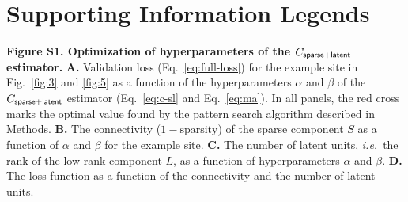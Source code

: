 \newpage
\section*{Supporting Information Legends}
%
% 
\begin{description}
\item {\bf Figure S1. Optimization of hyperparameters of the $C_{\sf sparse+latent}$ estimator.} {\bf A.} Validation loss (Eq.~\ref{eq:full-loss}) for the example site in Fig.~\ref{fig:3} and \ref{fig:5} as a function of the hyperparameters $\alpha$ and $\beta$ of the $C_{\sf sparse+latent}$ estimator (Eq.~\ref{eq:c-sl} and Eq.~\ref{eq:ma}). In all panels, the red cross marks the optimal value found by the pattern search algorithm described in Methods.
{\bf B.} The connectivity ($1-\mbox{sparsity}$) of the sparse component $S$ as a function of $\alpha$ and $\beta$ for the example site.
{\bf C.} The number of latent units, \emph{i.e.}~the rank of the low-rank component $L$, as a function of hyperparameters $\alpha$ and $\beta$.
{\bf D.} The loss function as a function of the connectivity and the number of latent units.
\end{description}


